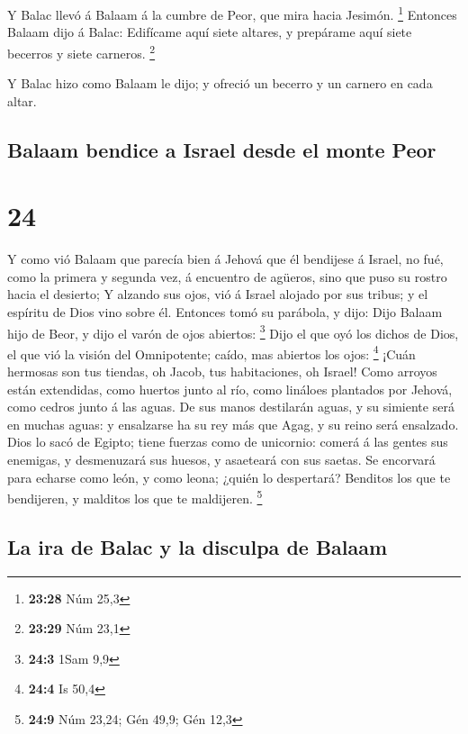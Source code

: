  Y Balac llevó á Balaam á la cumbre de Peor, que mira hacia
Jesimón. \footnote{\textbf{23:28} Núm 25,3}  Entonces
Balaam dijo á Balac: Edifícame aquí siete altares, y prepárame aquí
siete becerros y siete carneros. \footnote{\textbf{23:29} Núm 23,1}

 Y Balac hizo como Balaam le dijo; y ofreció un becerro y
un carnero en cada altar.

\hypertarget{balaam-bendice-a-israel-desde-el-monte-peor}{%
\subsection{Balaam bendice a Israel desde el monte
Peor}\label{balaam-bendice-a-israel-desde-el-monte-peor}}

\hypertarget{section-23}{%
\section{24}\label{section-23}}

 Y como vió Balaam que parecía bien á Jehová que él
bendijese á Israel, no fué, como la primera y segunda vez, á encuentro
de agüeros, sino que puso su rostro hacia el desierto;  Y
alzando sus ojos, vió á Israel alojado por sus tribus; y el espíritu de
Dios vino sobre él.  Entonces tomó su parábola, y dijo: Dijo
Balaam hijo de Beor, y dijo el varón de ojos abiertos: \footnote{\textbf{24:3}
  1Sam 9,9}  Dijo el que oyó los dichos de Dios, el que vió
la visión del Omnipotente; caído, mas abiertos los ojos: \footnote{\textbf{24:4}
  Is 50,4}  ¡Cuán hermosas son tus tiendas, oh Jacob, tus
habitaciones, oh Israel!  Como arroyos están extendidas,
como huertos junto al río, como lináloes plantados por Jehová, como
cedros junto á las aguas.  De sus manos destilarán aguas, y
su simiente será en muchas aguas: y ensalzarse ha su rey más que Agag, y
su reino será ensalzado.  Dios lo sacó de Egipto; tiene
fuerzas como de unicornio: comerá á las gentes sus enemigas, y
desmenuzará sus huesos, y asaeteará con sus saetas.  Se
encorvará para echarse como león, y como leona; ¿quién lo despertará?
Benditos los que te bendijeren, y malditos los que te maldijeren.
\footnote{\textbf{24:9} Núm 23,24; Gén 49,9; Gén 12,3}

\hypertarget{la-ira-de-balac-y-la-disculpa-de-balaam}{%
\subsection{La ira de Balac y la disculpa de
Balaam}\label{la-ira-de-balac-y-la-disculpa-de-balaam}}

